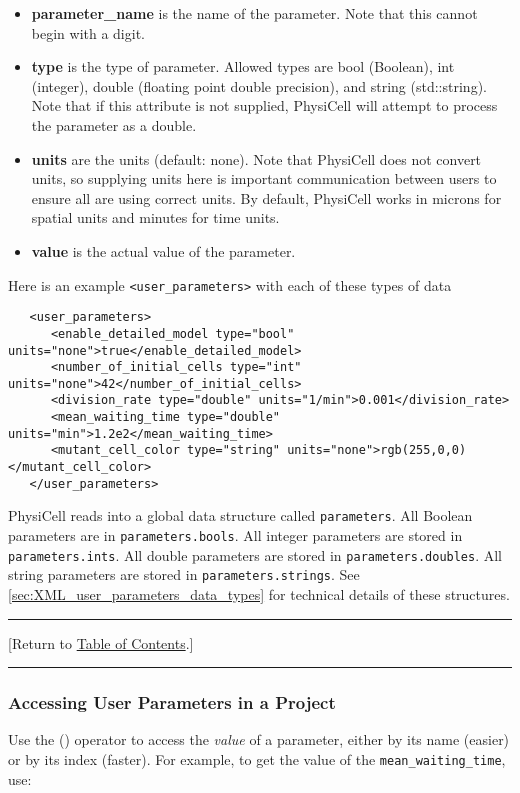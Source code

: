 \documentclass[12pt]{article}
\renewcommand{\v}{\verb}
\newcommand{\TOClink}{\begin{center}\hrule\vskip-10pt\phantom{.}\hfill[Return to \hyperlink{TOC}{Table of Contents}.]\hfill\phantom{.}\vskip3pt\hrule\end{center}}
\begin{document}
\begin{itemize}
\item \textbf{parameter\_name} is the name of the parameter. Note that this cannot begin with a digit. 
\item \textbf{type} is the type of parameter. Allowed types are bool (Boolean), int (integer), double (floating point double precision), and string (std::string). Note that if this attribute is not supplied, PhysiCell will attempt to process the parameter as a double. 
\item \textbf{units} are the units (default: none). Note that PhysiCell does not convert units, so supplying units here is important communication between users to ensure all are using correct units. By default, PhysiCell works in microns for spatial units and minutes for time units. 
\item \textbf{value} is the actual value of the parameter. 
\end{itemize}

Here is an example \v|<user_parameters>| with each of these types of data
\begin{verbatim}
   <user_parameters>
      <enable_detailed_model type="bool" units="none">true</enable_detailed_model>
      <number_of_initial_cells type="int" units="none">42</number_of_initial_cells>
      <division_rate type="double" units="1/min">0.001</division_rate>
      <mean_waiting_time type="double" units="min">1.2e2</mean_waiting_time>
      <mutant_cell_color type="string" units="none">rgb(255,0,0)</mutant_cell_color>
   </user_parameters>
\end{verbatim}

PhysiCell reads into a global data structure called \v|parameters|. All Boolean 
parameters are in \v|parameters.bools|. All integer parameters are stored in 
\v|parameters.ints|. All double parameters are stored in \v|parameters.doubles|. 
All string parameters are stored in \v|parameters.strings|. See 
\ref{sec:XML_user_parameters_data_types} for technical details of 
these structures. 

\TOClink

\subsubsection{Accessing User Parameters in a Project}
\label{sec:XML_user_parameters_reading_them}
Use the () operator to access the \emph{value} of a parameter, either 
by its name (easier) or by its index (faster). For example, to get 
the value of the \v|mean_waiting_time|, use: 
\end{document}

